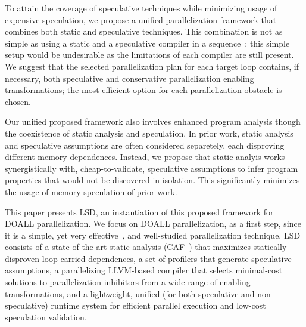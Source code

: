 To attain the coverage of speculative techniques while minimizing usage of
expensive speculation,
we propose a unified parallelization framework that combines both static and
speculative techniques.
This combination is not as simple as using a static and a speculative compiler
in a sequence~\cite{kim:12:cgo}; this simple setup would be undesirable as
the limitations of each compiler are still present.
%
We suggest that the selected parallelization plan for each target loop contains,
if necessary, both speculative and conservative parallelization enabling
transformations; the most efficient option for each parallelization obstacle is
chosen.
%
%

Our unified proposed framework also involves enhanced program analysis though
the coexistence of static analysis and speculation. In prior work, static
analysis and speculative assumptions are often considered separetely, each
disproving different memory dependences. Instead, we propose that static analyis
works synergistically with, cheap-to-validate, speculative assumptions to infer
program properties that would not be discovered in isolation. This significantly
minimizes the usage of memory speculation of prior work.




This paper presents LSD, an instantiation of this proposed framework for DOALL
parallelization. We focus on DOALL parallelization, as a first step, since it is
a simple, yet very effective~\cite{zhong:08:hpca}, and well-studied
parallelization technique.
LSD consists of a state-of-the-art static analysis (CAF~\cite{CAF, }) that
maximizes statically disproven loop-carried dependences, a set of profilers that
generate speculative assumptions, a parallelizing LLVM-based compiler that
selects minimal-cost solutions to parallelization inhibitors from a wide range
of enabling transformations, and a lightweight, unified (for both speculative
and non-speculative) runtime system for efficient parallel execution and
low-cost speculation validation.
%

